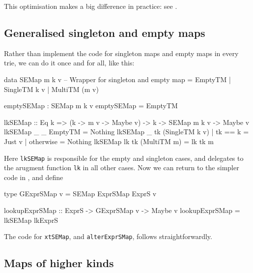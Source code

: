 \documentclass[acmsmall]{acmart}
\theoremstyle{theorem}
\theoremstyle{definition}
\theoremstyle{remark}
\begin{document}
This optimisation makes a big difference in practice: see .

\subsection{Generalised singleton and empty maps} \label{sec:generalised}

Rather than implement the code for singleton maps and empty maps in every trie,
we can do it once and for all, like this:
\begin{code}
data SEMap m k v  -- Wrapper for singleton and empty map
  = EmptyTM | SingleTM k v | MultiTM (m v)

emptySEMap : SEMap m k v
emptySEMap = EmptyTM

lkSEMap :: Eq k => (k -> m v -> Maybe v) -> k -> SEMap m k v -> Maybe v
lkSEMap _  _  EmptyTM                    = Nothing
lkSEMap _  tk (SingleTM k v) | tk == k   = Just v
                             | otherwise = Nothing
lkSEMap lk tk (MultiTM m)                = lk tk m
\end{code}
Here \lstinline{lkSEMap} is responsible for the empty and singleton
cases, and delegates to the arugment function \lstinline{lk} in all other cases.
Now we can return to the simpler code in , and define
\begin{code}
type GExprSMap v = SEMap ExprSMap ExprS v

lookupExprSMap :: ExprS -> GExprSMap v -> Maybe v
lookupExprSMap = lkSEMap lkExprS
\end{code}
The code for \lstinline{xtSEMap}, and \lstinline{alterExprSMap}, follows straightforwardly.

\subsection{Maps of higher kinds}
\end{document}
